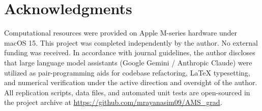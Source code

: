 \section*{Acknowledgments}

Computational resources were provided on Apple M-series hardware under macOS 15. This project was completed independently by the author. No external funding was received. In accordance with journal guidelines, the author discloses that large language model assistants (Google Gemini / Anthropic Claude) were utilized as pair-programming aids for codebase refactoring, LaTeX typesetting, and numerical verification under the active direction and oversight of the author. All replication scripts, data files, and automated unit tests are open-sourced in the project archive at \url{https://github.com/mrayanasim09/AMS_grad}.
